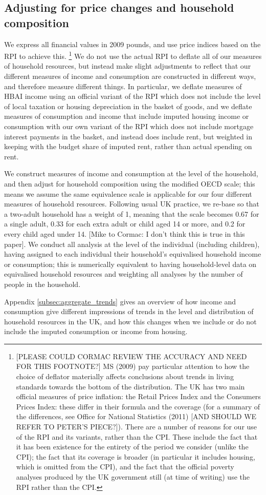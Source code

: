 \subsection{Adjusting for price changes and household composition}
We express all financial values in 2009 pounds, and use price indices based on the RPI to achieve this. \footnote{[PLEASE COULD CORMAC REVIEW THE ACCURACY AND NEED FOR THIS FOOTNOTE?] MS (2009) pay particular attention to how the choice of deflator materially affects conclusions about trends in living standards towards the bottom of the distribution. The UK has two main official measures of price inflation: the Retail Prices Index and the Consumers Prices Index: these differ in their formula and the coverage (for a summary of the differences, see Office for National Statistics (2011) [AND SHOULD WE REFER TO PETER'S PIECE?]). There are a number of reasons for our use of the RPI and its variants, rather than the CPI. These include the fact that it has been existence for the entirety of the period we consider (unlike the CPI); the fact that its coverage is broader (in particular it includes housing, which is omitted from the CPI), and the fact that the official poverty analyses produced by the UK government still (at time of writing) use the RPI rather than the CPI.} We do not use the actual RPI to deflate all of our measures of household resources, but instead make slight adjustments to reflect that our different measures of income and consumption are constructed in different ways, and therefore measure different things. In particular, we deflate measures of HBAI income using an official variant of the RPI which does not include the level of local taxation or housing depreciation in the basket of goods, and we deflate measures of consumption and income that include imputed housing income or consumption with our own variant of the RPI which does not include mortgage interest payments in the basket, and instead does include rent, but weighted in keeping with the budget share of imputed rent, rather than actual spending on rent. 

We construct measures of income and consumption at the level of the household, and then adjust for household composition using the modified OECD scale; this means we assume the same equivalence scale is applicable for our four different measures of household resources. Following usual UK practice, we re-base so that a two-adult household has a weight of 1, meaning that the scale becomes 0.67 for a single adult, 0.33 for each extra adult or child aged 14 or more, and 0.2 for every child aged under 14. [Mike to Cormac: I don't think this is true in this paper]. We conduct all analysis at the level of the individual (including children), having assigned to each individual their household's equivalised household income or consumption; this is numerically equivalent to having household-level data on equivalised household resources and weighting all analyses by the number of people in the household.

Appendix \ref{subsec:aggregate_trends} gives an overview of how income and consumption give different impressions of trends in the level and distribution of household resources in the UK, and how this changes when we include or do not include the imputed consumption or income from housing.